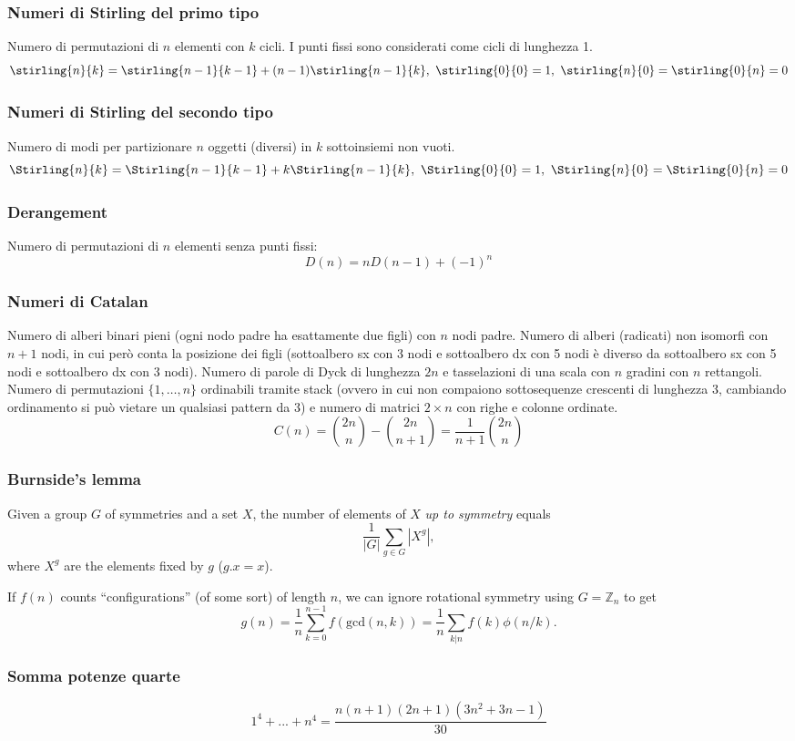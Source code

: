 \subsubsection{Numeri di Stirling del primo tipo}
Numero di permutazioni di $n$ elementi con $k$ cicli. I punti fissi sono considerati come cicli di lunghezza 1.
$$ \stirling{n}{k} = \stirling{n-1}{k-1} + (n-1)\stirling{n-1}{k}, \ \stirling{0}{0}=1, \ \stirling{n}{0}=\stirling{0}{n}=0$$

\subsubsection{Numeri di Stirling del secondo tipo}
Numero di modi per partizionare $n$ oggetti (diversi) in $k$ sottoinsiemi non vuoti.
$$ \Stirling{n}{k} = \Stirling{n-1}{k-1} + k\Stirling{n-1}{k}, \ \Stirling{0}{0}=1,\ \Stirling{n}{0}=\Stirling{0}{n}=0 $$

\subsubsection{Derangement}
Numero di permutazioni di $n$ elementi senza punti fissi: $$ D(n)=nD(n-1)+(-1)^n $$

\subsubsection{Numeri di Catalan}
Numero di alberi binari pieni (ogni nodo padre ha esattamente due figli) con $n$ nodi padre.
Numero di alberi (radicati) non isomorfi con $n+1$ nodi, in cui però conta la posizione dei figli (sottoalbero sx con 3 nodi e sottoalbero dx con 5 nodi è diverso da sottoalbero sx con 5 nodi e sottoalbero dx con 3 nodi).
Numero di parole di Dyck di lunghezza $2n$ e tasselazioni di una scala con $n$ gradini con $n$ rettangoli.
Numero di permutazioni $\{1,\dots,n\}$ ordinabili tramite stack (ovvero in cui non compaiono sottosequenze crescenti di lunghezza 3, cambiando ordinamento si può vietare un qualsiasi pattern da 3) e numero di matrici $2\times n$ con righe e colonne ordinate.
$$ C(n)=\binom{2n}{n}-\binom{2n}{n+1}=\frac{1}{n+1}\binom{2n}{n} $$

\subsubsection{Burnside's lemma}
		Given a group $G$ of symmetries and a set $X$, the number of elements of $X$ \emph{up to symmetry} equals
		 \[ {\frac {1}{|G|}}\sum _{{g\in G}}|X^{g}|, \]
		 where $X^{g}$ are the elements fixed by $g$ ($g.x = x$).

		 If $f(n)$ counts ``configurations'' (of some sort) of length $n$, we can ignore rotational symmetry using $G = \mathbb Z_n$ to get
		 \[ g(n) = \frac 1 n \sum_{k=0}^{n-1}{f(\text{gcd}(n, k))} = \frac 1 n \sum_{k|n}{f(k)\phi(n/k)}. \]

\subsubsection{Somma potenze quarte}
$$ 1^4+...+n^4=\frac{n(n+1)(2n+1)(3n^2+3n-1)}{30} $$
